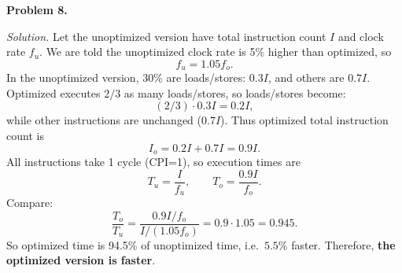 \documentclass[12pt]{article}
\newcommand{\problem}[1]{\vspace{0.5em}\noindent\textbf{Problem #1.}\vspace{0.3em}}
\newenvironment{solution}{\par\noindent\textit{Solution.}}{\par\vspace{1em}}
\begin{document}
\problem{8}
\begin{solution}
Let the unoptimized version have total instruction count $I$ and clock rate $f_u$.
We are told the unoptimized clock rate is 5\% higher than optimized, so
\[
f_u = 1.05 f_o.
\]
In the unoptimized version, 30\% are loads/stores: $0.3I$, and others are $0.7I$.
Optimized executes $2/3$ as many loads/stores, so loads/stores become:
\[
(2/3)\cdot 0.3I = 0.2I,
\]
while other instructions are unchanged ($0.7I$). Thus optimized total instruction count is
\[
I_o = 0.2I+0.7I=0.9I.
\]
All instructions take 1 cycle (CPI=1), so execution times are
\[
T_u = \frac{I}{f_u},\qquad T_o=\frac{0.9I}{f_o}.
\]
Compare:
\[
\frac{T_o}{T_u}=\frac{0.9I/f_o}{I/(1.05f_o)}=0.9\cdot 1.05 = 0.945.
\]
So optimized time is 94.5\% of unoptimized time, i.e.\ \(\boxed{5.5\%}\) faster.
Therefore, \textbf{the optimized version is faster}.

\end{solution}
\end{document}
